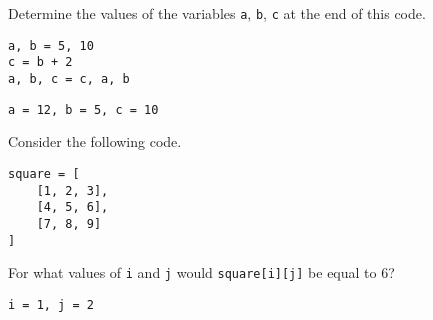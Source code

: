 \documentclass[12pt,answers]{exam}
\begin{document}
\begin{questions}


\question Determine the values of the variables \verb|a|, \verb|b|, \verb|c| at the end of this code. 
\begin{verbatim}
a, b = 5, 10
c = b + 2
a, b, c = c, a, b
\end{verbatim}

\begin{solution}
\verb|a = 12, b = 5, c = 10|
\end{solution}
\vfill

\newpage
\question Consider the following code.
\begin{verbatim}
square = [
    [1, 2, 3], 
    [4, 5, 6], 
    [7, 8, 9]
]
\end{verbatim}
\begin{parts}
\item For what values of \verb|i| and \verb|j| would \verb|square[i][j]| be equal to 6? 
\begin{solution}
\verb|i = 1, j = 2|
\end{solution}
\bigskip
\bigskip


\end{parts}
\end{questions}
\end{document}
